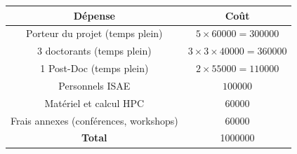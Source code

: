 \documentclass[12pt, french]{article}
\begin{document}
\begin{center}
\begin{tabular}{|c|c|}
	\hline
	D\'epense & Co\^{u}t \\
	\hline
	Porteur du projet (temps plein) & $5\times 60000=300000$ \\
	3 doctorants (temps plein) & $3\times 3\times 40000=360000$  \\
	1 Post-Doc (temps plein) & $2\times 55000=110000$ \\
	Personnels ISAE & $100000$ \\
	Matériel  et calcul HPC & $60000$ \\
	Frais annexes (conférences, workshops) & $60000$ \\
	\hline
	\textbf{Total} & 1000000 \\
	\hline
\end{tabular}
\end{center}



\footnotesize


\end{document}
